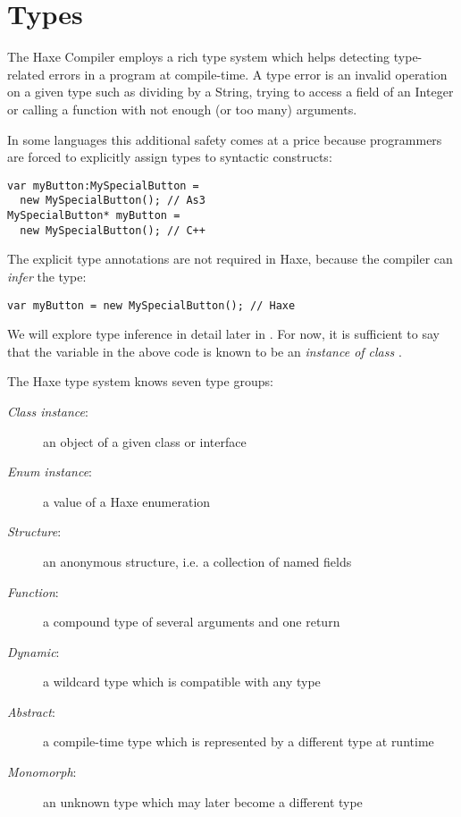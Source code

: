 \chapter{Types}
\label{types}

The Haxe Compiler employs a rich type system which helps detecting type-related errors in a program at compile-time. A type error is an invalid operation on a given type such as dividing by a String, trying to access a field of an Integer or calling a function with not enough (or too many) arguments.

In some languages this additional safety comes at a price because programmers are forced to explicitly assign types to syntactic constructs:

\begin{lstlisting}
var myButton:MySpecialButton =
  new MySpecialButton(); // As3
MySpecialButton* myButton =
  new MySpecialButton(); // C++ 
\end{lstlisting}
The explicit type annotations are not required in Haxe, because the compiler can \emph{infer} the type:

\begin{lstlisting}
var myButton = new MySpecialButton(); // Haxe
\end{lstlisting}
We will explore type inference in detail later in . For now, it is sufficient to say that the variable  in the above code is known to be an \emph{instance of class} . 

The Haxe type system knows seven type groups:

\begin{description}
 \item[\emph{Class instance}:] an object of a given class or interface
 \item[\emph{Enum instance}:] a value of a Haxe enumeration
 \item[\emph{Structure}:] an anonymous structure, i.e. a collection of named fields
 \item[\emph{Function}:] a compound type of several arguments and one return
 \item[\emph{Dynamic}:] a wildcard type which is compatible with any type
 \item[\emph{Abstract}:] a compile-time type which is represented by a different type at runtime
 \item[\emph{Monomorph}:] an unknown type which may later become a different type
\end{description}

